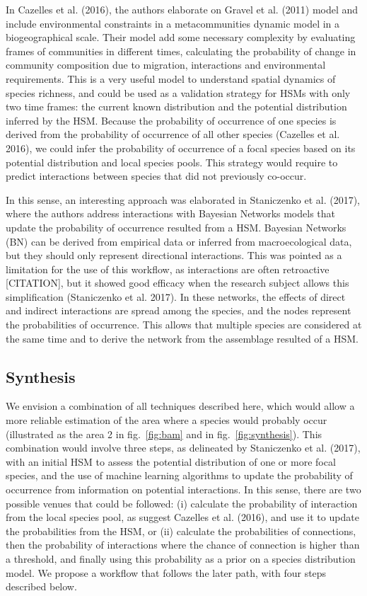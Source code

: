 \documentclass[11pt]{article}
\begin{document}
In Cazelles et al. (2016), the authors elaborate on Gravel et al. (2011)
model and include environmental constraints in a metacommunities dynamic
model in a biogeographical scale. Their model add some necessary
complexity by evaluating frames of communities in different times,
calculating the probability of change in community composition due to
migration, interactions and environmental requirements. This is a very
useful model to understand spatial dynamics of species richness, and
could be used as a validation strategy for HSMs with only two time
frames: the current known distribution and the potential distribution
inferred by the HSM. Because the probability of occurrence of one
species is derived from the probability of occurrence of all other
species (Cazelles et al. 2016), we could infer the probability of
occurrence of a focal species based on its potential distribution and
local species pools. This strategy would require to predict interactions
between species that did not previously co-occur.

In this sense, an interesting approach was elaborated in Staniczenko et
al. (2017), where the authors address interactions with Bayesian
Networks models that update the probability of occurrence resulted from
a HSM. Bayesian Networks (BN) can be derived from empirical data or
inferred from macroecological data, but they should only represent
directional interactions. This was pointed as a limitation for the use
of this workflow, as interactions are often retroactive {[}CITATION{]},
but it showed good efficacy when the research subject allows this
simplification (Staniczenko et al. 2017). In these networks, the effects
of direct and indirect interactions are spread among the species, and
the nodes represent the probabilities of occurrence. This allows that
multiple species are considered at the same time and to derive the
network from the assemblage resulted of a HSM.

\hypertarget{synthesis}{%
\subsection{Synthesis}\label{synthesis}}

We envision a combination of all techniques described here, which would
allow a more reliable estimation of the area where a species would
probably occur (illustrated as the area 2 in fig.~\ref{fig:bam} and in
fig.~\ref{fig:synthesis}). This combination would involve three steps,
as delineated by Staniczenko et al. (2017), with an initial HSM to
assess the potential distribution of one or more focal species, and the
use of machine learning algorithms to update the probability of
occurrence from information on potential interactions. In this sense,
there are two possible venues that could be followed: (i) calculate the
probability of interaction from the local species pool, as suggest
Cazelles et al. (2016), and use it to update the probabilities from the
HSM, or (ii) calculate the probabilities of connections, then the
probability of interactions where the chance of connection is higher
than a threshold, and finally using this probability as a prior on a
species distribution model. We propose a workflow that follows the later
path, with four steps described below.
\end{document}
